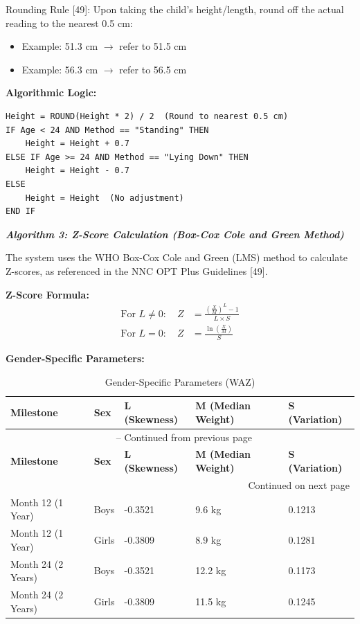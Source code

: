 \documentclass[12pt, a4paper]{report}
\begin{document}
Rounding Rule [49]: Upon taking the child's height/length, round off the actual reading to the nearest 0.5 cm:
\begin{itemize}
    \item Example: 51.3 cm \(\rightarrow\) refer to 51.5 cm
    \item Example: 56.3 cm \(\rightarrow\) refer to 56.5 cm
\end{itemize}

\noindent \textbf{Algorithmic Logic:}
\begin{verbatim}
Height = ROUND(Height * 2) / 2  (Round to nearest 0.5 cm)
IF Age < 24 AND Method == "Standing" THEN
    Height = Height + 0.7
ELSE IF Age >= 24 AND Method == "Lying Down" THEN
    Height = Height - 0.7
ELSE
    Height = Height  (No adjustment)
END IF
\end{verbatim}

\noindent \textbf{\textit{Algorithm 3: Z-Score Calculation (Box-Cox Cole and Green Method)}}

The system uses the WHO Box-Cox Cole and Green (LMS) method to calculate Z-scores, as referenced in the NNC OPT Plus Guidelines [49].

\noindent \textbf{Z-Score Formula:}
\begin{align}
    \text{For } L \neq 0: \quad Z &= \frac{\left(\frac{X}{M}\right)^L - 1}{L \times S} \\
    \text{For } L = 0: \quad Z &= \frac{\ln\left(\frac{X}{M}\right)}{S}
\end{align}

\noindent \textbf{Gender-Specific Parameters:}

\vspace{0.3cm}
\begin{longtable}{p{3.5cm} p{2.5cm} p{3cm} p{3.5cm} p{3cm}}
    \caption{Gender-Specific Parameters (WAZ)} \label{tab:waz_params} \\
    \toprule
    \textbf{Milestone} & \textbf{Sex} & \textbf{L (Skewness)} & \textbf{M (Median Weight)} & \textbf{S (Variation)} \\
    \midrule
    \endfirsthead
    \multicolumn{5}{c}{{\tablename\ \thetable{} -- Continued from previous page}} \\
    \toprule
    \textbf{Milestone} & \textbf{Sex} & \textbf{L (Skewness)} & \textbf{M (Median Weight)} & \textbf{S (Variation)} \\
    \midrule
    \endhead
    \midrule
    \multicolumn{5}{r}{{Continued on next page}} \\
    \endfoot
    \bottomrule
    \endlastfoot
    Month 12 (1 Year) & Boys & -0.3521 & 9.6 kg & 0.1213 \\
    \addlinespace
    Month 12 (1 Year) & Girls & -0.3809 & 8.9 kg & 0.1281 \\
    \addlinespace
    Month 24 (2 Years) & Boys & -0.3521 & 12.2 kg & 0.1173 \\
    \addlinespace
    Month 24 (2 Years) & Girls & -0.3809 & 11.5 kg & 0.1245 \\
\end{longtable}
\vspace{0.3cm}
\end{document}
